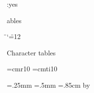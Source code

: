 \ToVerso
\Shallow:yes
\subject[table] Tables

\storecat\" \catcode`\"=12

\hbox{}\vskip-80pt \hbox{}
\point Character tables\par
\hbox{}\vskip-40pt \hbox{}

\def\titlefont{\SansSerif \PointSize:10 \Style:roman }
\def\bitfont{\SerifFont \PointSize:7 \Style:Roman }
\def\codefont{\SansSerif \PointSize:5 \Style:roman }
\def\namefont{\SansSerif \PointSize:11 \Style:roman }
\let\commentfont\titlefont
\font\cmtenrm=cmr10 \font\cmtenit=cmti10

\newdimen\thinlinewidth \thinlinewidth=.25mm
\newdimen\fatlinewidth \fatlinewidth=.5mm
\newdimen\rowheight \rowheight=.85cm %
\newdimen\colwidth  \colwidth=1.2cm %
\newdimen\Colwidth {}\colwidth
  \advance\Colwidth by \thinlinewidth
\newdimen\topwhite \topwhite=2pt
\newdimen\botwhite \botwhite=3pt
\newdimen\leftwhite \leftwhite=0pt %
\newdimen\rightwhite \rightwhite=1pt %
\newcount\rowcount 
\newcount\colcount 
{} %
\newcount\thenumber

\def\\{$\backslash$}\def\-{\_$\!$\_}\def\^{\char94}
\def\hh#1{\char'136\char'136 {#1}\ignorespaces}
\def\thinline{\vrule width \thinlinewidth}
\def\fatline{\vrule width \fatlinewidth}

\def\calcnumber{{\multiply\colcount by 16
                 \advance\colcount by \rowcount
                 \global\thenumber=\colcount}}
\def\deccode{\number\thenumber}
\def\octcode{{\ifnum\thenumber>63
                            \advance\thenumber by -64
                            \count0=\thenumber \divide\count0 by 8
                            1\number\count0
              \else         \count0=\thenumber \divide\count0 by 8
                            \ifnum\count0>0 \number\count0 \fi\fi
              \multiply\count0 by 8
              \advance\thenumber by -\count0
              \number\thenumber}}
\def\hexdigit#1{\ifcase#1 0\or 1\or 2\or 3\or 4\or 5\or 6\or 7\or
                          8\or 9\or A\or B\or C\or D\or E\or F\or
                          \edef\tmp{\message{illegal hex digit 
                                        \number#1}}\tmp
                          \fi}
\def\hexcode{{\count0=\thenumber \divide\count0 by 16
              \ifnum\count0>0 \hexdigit{\count0}\fi
              \multiply\count0 by 16
              \advance\thenumber by -\count0 \count0=\thenumber
              \hexdigit{\count0}}}

